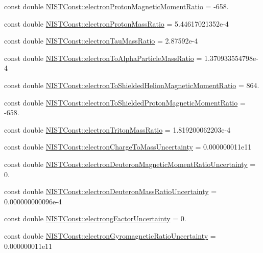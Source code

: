 \begin{DoxyCompactItemize}
\item 
const double \hyperlink{group___n_i_s_t_const-_electron_ga8ea70b9b79c3f8b4f9825c48d1758f44}{N\+I\+S\+T\+Const\+::electron\+Proton\+Magnetic\+Moment\+Ratio} = -\/658.
\item 
const double \hyperlink{group___n_i_s_t_const-_electron_gabbaa23094e18f2b83e6145adaebbb6e7}{N\+I\+S\+T\+Const\+::electron\+Proton\+Mass\+Ratio} = 5.\+44617021352e-\/4
\item 
const double \hyperlink{group___n_i_s_t_const-_electron_ga513e30853388cdd091c192dfb6371fa8}{N\+I\+S\+T\+Const\+::electron\+Tau\+Mass\+Ratio} = 2.\+87592e-\/4
\item 
const double \hyperlink{group___n_i_s_t_const-_electron_ga1090a3f764cafde391a3dfe7f459a94d}{N\+I\+S\+T\+Const\+::electron\+To\+Alpha\+Particle\+Mass\+Ratio} = 1.\+370933554798e-\/4
\item 
const double \hyperlink{group___n_i_s_t_const-_electron_gaff98723ab3ee4e1be57a04f2a0f6034d}{N\+I\+S\+T\+Const\+::electron\+To\+Shielded\+Helion\+Magnetic\+Moment\+Ratio} = 864.
\item 
const double \hyperlink{group___n_i_s_t_const-_electron_gacf35e7562c94178f6b182cff46131b6d}{N\+I\+S\+T\+Const\+::electron\+To\+Shielded\+Proton\+Magnetic\+Moment\+Ratio} = -\/658.
\item 
const double \hyperlink{group___n_i_s_t_const-_electron_gac9bfee1055b6fd5d3dabb3126318b52e}{N\+I\+S\+T\+Const\+::electron\+Triton\+Mass\+Ratio} = 1.\+819200062203e-\/4
\item 
const double \hyperlink{group___n_i_s_t_const-_electron_ga90e4e7aa66c8c40335aaafed9095e3ac}{N\+I\+S\+T\+Const\+::electron\+Charge\+To\+Mass\+Uncertainty} = 0.\+000000011e11
\item 
const double \hyperlink{group___n_i_s_t_const-_electron_ga1d1118a17f6d7d9c134df7af6d6e934f}{N\+I\+S\+T\+Const\+::electron\+Deuteron\+Magnetic\+Moment\+Ratio\+Uncertainty} = 0.
\item 
const double \hyperlink{group___n_i_s_t_const-_electron_gafae2e6fc55bf26f9e9d1bd6696a9bd5f}{N\+I\+S\+T\+Const\+::electron\+Deuteron\+Mass\+Ratio\+Uncertainty} = 0.\+000000000096e-\/4
\item 
const double \hyperlink{group___n_i_s_t_const-_electron_gadc2798c29deb855a95f7f0489c9af4cc}{N\+I\+S\+T\+Const\+::electrong\+Factor\+Uncertainty} = 0.
\item 
const double \hyperlink{group___n_i_s_t_const-_electron_gaca70ad0d6ddcb9cd3f29880a30415db8}{N\+I\+S\+T\+Const\+::electron\+Gyromagnetic\+Ratio\+Uncertainty} = 0.\+000000011e11

\end{DoxyCompactItemize}
